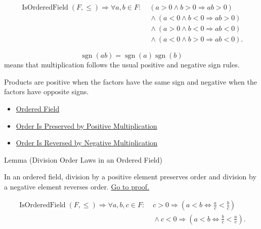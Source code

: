 \begin{remark*}
\[
\begin{aligned}
\operatorname{IsOrderedField}(F,\leq)
\Longrightarrow
\forall a,b\in F{:}\;&
(a>0\land b>0 \Longrightarrow ab>0)
\\
&{}\land
(a<0\land b<0 \Longrightarrow ab>0)
\\
&{}\land
(a>0\land b<0 \Longrightarrow ab<0)
\\
&{}\land
(a<0\land b>0 \Longrightarrow ab<0).
\end{aligned}
\]
\end{remark*}

\begin{remark*}
\[
\operatorname{sgn}(ab)=\operatorname{sgn}(a)\operatorname{sgn}(b)
\]
means that multiplication follows the usual positive and negative sign rules.
\end{remark*}

\begin{remark*}[Interpretation]
Products are positive when the factors have the same sign and negative when
the factors have opposite signs.
\end{remark*}

\begin{dependencies}
\begin{itemize}
  \item \hyperref[def:ordered-field]{Ordered Field}
  \item \hyperref[thm:ordered-field-positive-multiplication-preserves-order]{Order Is Preserved by Positive Multiplication}
  \item \hyperref[thm:ordered-field-negative-multiplication-reverses-order]{Order Is Reversed by Negative Multiplication}
\end{itemize}
\end{dependencies}

\begin{lemmabox}{Lemma (Division Order Laws in an Ordered Field)}
\begin{lemma}\label{lem:ordered-field-division-order-laws}
In an ordered field, division by a positive element preserves order and
division by a negative element reverses order.
\hyperref[prf:ordered-field-division-order-laws]{Go to proof.}
\end{lemma}
\end{lemmabox}

\begin{remark*}
\[
\begin{aligned}
\operatorname{IsOrderedField}(F,\leq)
\Longrightarrow
\forall a,b,c\in F{:}\;&
c>0 \Longrightarrow
\left(a<b \Longleftrightarrow \frac{a}{c}<\frac{b}{c}\right)
\\
&{}\land
c<0 \Longrightarrow
\left(a<b \Longleftrightarrow \frac{b}{c}<\frac{a}{c}\right).
\end{aligned}
\]
\end{remark*}

